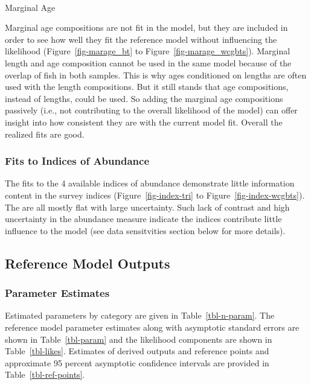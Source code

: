 \documentclass[
]{scrartcl}
\makeatletter
\let\oldparagraph\paragraph
\renewcommand{\paragraph}{
    \@ifstar
      \xxxParagraphStar
      \xxxParagraphNoStar
  }
\newcommand{\xxxParagraphStar}[1]{\oldparagraph*{#1}\mbox{}}
\newcommand{\xxxParagraphNoStar}[1]{\oldparagraph{#1}\mbox{}}
\makeatother
\begin{document}
\paragraph{Marginal Age}\label{marginal-age}

Marginal age compositions are not fit in the model, but they are
included in order to see how well they fit the reference model without
influencing the likelihood (Figure~\ref{fig-marage_bt} to
Figure~\ref{fig-marage_wcgbts}). Marginal length and age composition
cannot be used in the same model because of the overlap of fish in both
samples. This is why ages conditioned on lengths are often used with the
length compositions. But it still stands that age compositions, instead
of lengths, could be used. So adding the marginal age compositions
passively (i.e., not contributing to the overall likelihood of the
model) can offer insight into how consistent they are with the current
model fit. Overall the realized fits are good.

\subsubsection{Fits to Indices of
Abundance}\label{fits-to-indices-of-abundance}

The fits to the 4 available indices of abundance demonstrate little
information content in the survey indices (Figure~\ref{fig-index-tri} to
Figure~\ref{fig-index-wcgbts}). The are all mostly flat with large
uncertainty. Such lack of contrast and high uncertainty in the abundance
measure indicate the indices contribute little influence to the model
(see data sensitvities section below for more details).

\subsection{Reference Model Outputs}\label{reference-model-outputs}

\subsubsection{Parameter Estimates}\label{parameter-estimates}

Estimated parameters by category are given in Table~\ref{tbl-n-param}.
The reference model parameter estimates along with asymptotic standard
errors are shown in Table~\ref{tbl-param} and the likelihood components
are shown in Table~\ref{tbl-likes}. Estimates of derived outputs and
reference points and approximate 95 percent asymptotic confidence
intervals are provided in Table~\ref{tbl-ref-points}.
\end{document}
